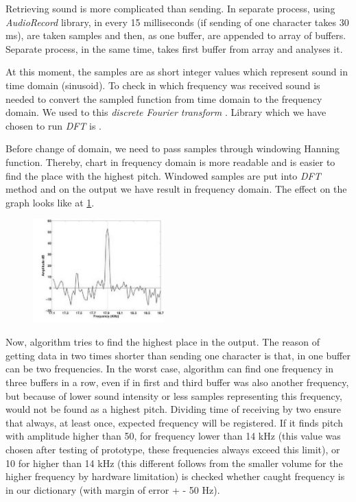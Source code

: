 \documentclass[11pt,titlepage]{article}
\theoremstyle{plain}
\begin{document}
Retrieving sound is more complicated than sending. In separate process, using \textit{AudioRecord} library, in every 15 milliseconds (if sending of one character takes 30 ms), are taken samples and then, as one buffer, are appended to array of buffers. Separate process, in the same time, takes first buffer from array and analyses it. 

\vspace{5mm}

At this moment, the samples are as short integer values which represent sound in time domain (sinusoid). To check in which frequency was received sound is needed to convert the sampled function from time domain to the frequency domain. We used to this \textit{discrete Fourier transform }. Library which we have chosen to run \textit{DFT} is \cite{minim_dft}. 

\vspace{5mm}

Before change of domain, we need to pass samples through windowing Hanning function. Thereby, chart in frequency domain is more readable and is easier to find the place with the highest pitch. Windowed samples are put into \textit{DFT} method and on the output we have result in frequency domain. The effect on the graph looks like at \ref{fig:F2}.


\begin{figure}[H]
	\centering
	\includegraphics[width=0.45\textwidth]{img/peaks_1}
	\label{fig:F2}
\end{figure}



Now, algorithm tries to find the highest place in the output. The reason of getting data in two times shorter than sending one character is that, in one buffer can be two frequencies. In the worst case, algorithm can find one frequency in three buffers in a row, even if in first and third buffer was also another frequency, but because of lower sound intensity or less samples representing this frequency, would not be found as a highest pitch. Dividing time of receiving by two ensure that always, at least once, expected frequency will be registered. If it finds pitch with amplitude higher than 50, for frequency lower than 14 kHz (this value was chosen after testing of prototype, these frequencies always exceed this limit), or 10 for higher than 14 kHz (this different follows from the smaller volume for the higher frequency by hardware limitation) is checked whether caught frequency is in our dictionary (with margin of error + - 50 Hz). 
\end{document}
